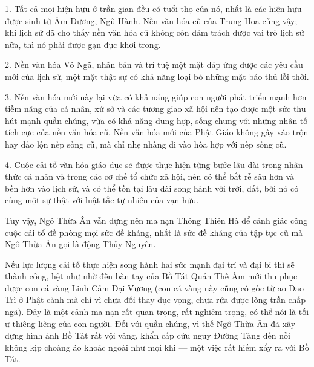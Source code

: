 1. Tất cả mọi hiện hữu ở trần gian đều có tuổi thọ của nó, nhất là các hiện hữu được sinh từ Âm Dương, Ngũ Hành. Nền văn hóa cũ của Trung Hoa cũng vậy; khi lịch sử đã cho thấy nền văn hóa cũ không còn đảm trách được vai trò lịch sử nữa, thì nó phải được gạn đục khơi trong.

2. Nền văn hóa Vô Ngã, nhân bản và trí tuệ một mặt đáp ứng được các yêu cầu mới của lịch sử, một mặt thật sự có khả năng loại bỏ những mặt bảo thủ lỗi thời.

3. Nền văn hóa mới này lại vừa có khả năng giúp con người phát triển mạnh hơn tiềm năng của cá nhân, xứ sở và các tương giao xã hội nên tạo được một sức thu hút mạnh quần chúng, vừa có khả năng dung hợp, sống chung với những nhân tố tích cực của nền văn hóa cũ. Nền văn hóa mới của Phật Giáo không gây xáo trộn hay đảo lộn nếp sống cũ, mà chỉ nhẹ nhàng đi vào hòa hợp với nếp sống cũ.

4. Cuộc cải tổ văn hóa giáo dục sẽ được thực hiện từng bước lâu dài trong nhận thức cá nhân và trong các cơ chế tổ chức xã hội, nên có thể bắt rễ sâu hơn và bền hơn vào lịch sử, và có thể tồn tại lâu dài song hành với trời, đất, bởi nó có cùng một sự thật với luật tắc tự nhiên của vạn hữu.

Tuy vậy, Ngô Thừa Ân vẫn dựng nên ma nạn Thông Thiên Hà để cảnh giác công cuộc cải tổ đề phòng mọi sức đề kháng, nhất là sức đề kháng của tập tục cũ mà Ngô Thừa Ân gọi là động Thủy Nguyên.

Nếu lực lượng cải tổ thực hiện song hành hai sức mạnh đại trí và đại bi thì sẽ thành công, hệt như nhờ đến bàn tay của Bồ Tát Quán Thế Âm mới thu phục được con cá vàng Linh Cảm Đại Vương (con cá vàng này cũng có gốc từ ao Dao Trì ở Phật cảnh mà chỉ vì chưa đổi thay dục vọng, chưa rửa được lòng trần chấp ngã). Đây là một cảnh ma nạn rất quan trọng, rất nghiêm trọng, có thể nói là tối ư thiêng liêng của con người. Đối với quần chúng, vì thế Ngô Thừa Ân đã xây dựng hình ảnh Bồ Tát rất vội vàng, khẩn cấp cứu nguy Đường Tăng đến nỗi không kịp choàng áo khoác ngoài như mọi khi — một việc rất hiếm xẩy ra với Bồ Tát.
